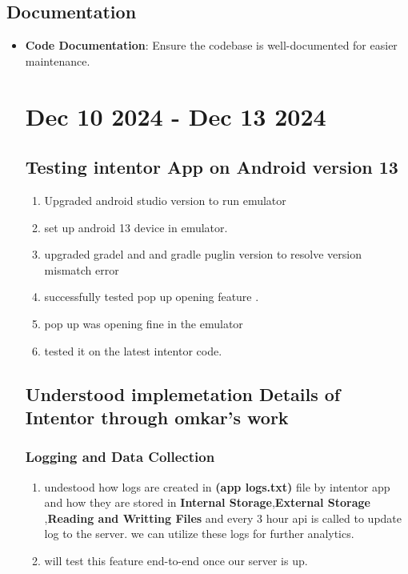 \documentclass[12pt]{article}
\begin{document}
    \subsection{Documentation }
    \begin{itemize}
        \item \textbf{Code Documentation}: Ensure the codebase is well-documented for easier maintenance.
        
     \section{Dec 10 2024 - Dec 13 2024}
     \subsection{Testing intentor App on Android version 13}
      \begin{enumerate}
          
          \item Upgraded android studio version to run emulator 
          \item set up android 13 device in emulator.
          \item upgraded gradel and and gradle puglin version to resolve version mismatch error
          \item successfully tested pop up opening feature .
          \item pop up was opening fine in the emulator
          \item tested it on the latest intentor code.
          \end{enumerate}
        \subsection{Understood implemetation Details of Intentor through omkar's work}
        \subsubsection{Logging and Data Collection}
        \begin{enumerate}
     \item undestood how logs are created in \textbf{(app logs.txt)} file by intentor app and how they are  stored in \textbf{Internal Storage},\textbf{External Storage} ,\textbf{Reading and Writting Files} and every 3 hour api is called to update log to the server. we can utilize these logs for further analytics.
     \item will test this feature end-to-end once our server is up.
    

\end{enumerate}
\end{itemize}
\end{document}
